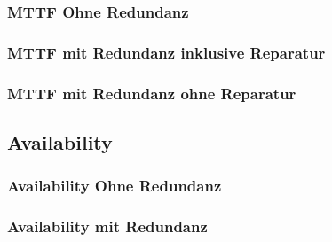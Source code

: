 \documentclass[
            a4paper
            ]{scrartcl}%
\begin{document}
\subsubsection{MTTF Ohne Redundanz}

\subsubsection{MTTF mit Redundanz inklusive Reparatur}

\subsubsection{MTTF mit Redundanz ohne Reparatur}

\subsection{Availability}
\subsubsection{Availability Ohne Redundanz}

\subsubsection{Availability mit Redundanz}

\end{document}
